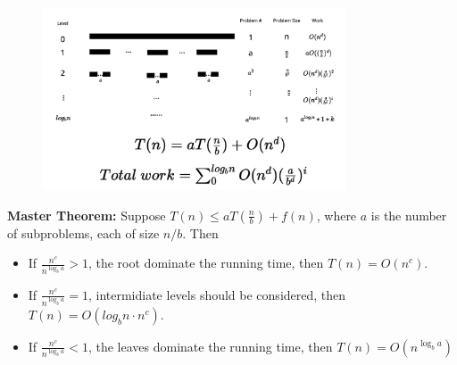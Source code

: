 \begin{figure}[H]
	\centering
	\includegraphics[width=0.8\textwidth]{master-method.png}
\end{figure}
\begin{theorem}
	\textbf{Master Theorem:} Suppose $T(n) \le a T(\frac{n}{b}) + f(n)$, where $a$ is the number of subproblems, each of size $n / b$. Then
	\begin{itemize}
		\item If $\frac{n^c}{n^{\log_b a}} > 1$, the root dominate the running time, then $T(n) = O(n^c)$.
		\item If $\frac{n^c}{n^{\log_b a}} = 1$, intermidiate levels should be considered, then $T(n) = O(log_b n \cdot n^c)$.
		\item If $\frac{n^c}{n^{\log_b a}} < 1$, the leaves dominate the running time, then $T(n) = O(n^{\log_b a})$
	\end{itemize}
\end{theorem}